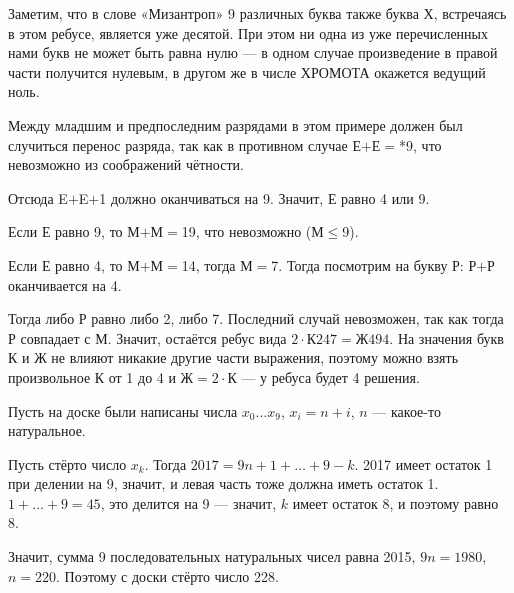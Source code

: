 \begin{itemize}

\itA Заметим, что в слове «Мизантроп» 9 различных букв\scolon а также буква Х, встречаясь в этом ребусе, является уже десятой. При этом ни одна из уже перечисленных нами букв не может быть равна нулю — в одном случае произведение в правой части получится нулевым, в другом же в числе ХРОМОТА окажется ведущий ноль.

\itB Между младшим и предпоследним разрядами в этом примере должен был случиться перенос разряда, так как в противном случае Е$+$Е$=$*9, что невозможно из соображений чётности.

Отсюда E$+$E$+$1 должно оканчиваться на 9. Значит, Е равно 4 или 9.

\subitem Если Е равно 9, то М$+$М$=$19, что невозможно (М$\le$9).

\subitem Если Е равно 4, то М$+$М$=$14, тогда М$=$7. Тогда посмотрим на букву Р: Р$+$Р оканчивается на 4.

Тогда либо Р равно либо 2, либо 7. Последний случай невозможен, так как тогда Р совпадает с М. Значит, остаётся ребус вида $2 \cdot \text{К247} = \text{Ж494}$. На значения букв К и Ж не влияют никакие другие части выражения, поэтому можно взять произвольное К от 1 до 4 и Ж$=$$2 \cdot$К — у ребуса будет 4 решения.

\itC Пусть на доске были написаны числа $x_0 \ldots x_9$, $x_i = n+i$, $n$ — какое-то натуральное.

Пусть стёрто число $x_k$. Тогда $2017 = 9n+ 1 + \ldots + 9 - k$. 2017 имеет остаток 1 при делении на 9, значит, и левая часть тоже должна иметь остаток 1. $1 + \ldots + 9 = 45$, это делится на 9 — значит, $k$ имеет остаток 8, и поэтому равно 8.

Значит, сумма 9 последовательных натуральных чисел равна 2015, $9n = 1980$, $n=220$. Поэтому с доски стёрто число 228.
\end{itemize}